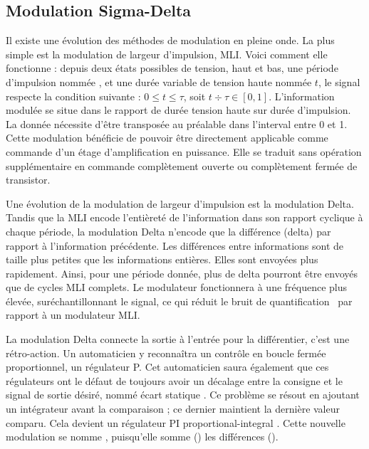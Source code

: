 \documentclass[10pt, oneside, a4paper]{article}
\newcommand{\important}[1]{\textbf{\textsf{\color{gray}{#1}}}}
\begin{document}
\subsection{Modulation Sigma-Delta}
	\label{sec:sigmaDelta}
Il existe une évolution des méthodes de modulation en pleine onde.
La plus simple est la modulation de largeur d'impulsion, MLI.
Voici comment elle fonctionne : depuis deux états possibles de tension, haut et bas, une période d'impulsion nommée \tau, et une durée variable de tension haute nommée $t$, le signal respecte la condition suivante : $0 \leq t \leq \tau $, soit $t \div \tau \in [0,1]$.
L'information modulée se situe dans le rapport de durée tension haute sur durée d'impulsion.
La donnée nécessite d'être transposée au préalable dans l'interval entre 0 et 1.
Cette modulation bénéficie de pouvoir être directement applicable comme commande d'un étage d'amplification en puissance.
Elle se traduit sans opération supplémentaire en commande complètement ouverte ou complètement fermée de transistor.

Une évolution de la modulation de largeur d'impulsion est la modulation Delta.
Tandis que la MLI encode l'entièreté de l'information dans son rapport cyclique à chaque période, la modulation Delta n'encode que la différence (delta) par rapport à l'information précédente.
Les différences entre informations sont de taille plus petites que les informations entières.
Elles sont envoyées plus rapidement.
Ainsi, pour une période donnée, plus de delta pourront être envoyés que de cycles MLI complets.
Le modulateur fonctionnera à une fréquence plus élevée, suréchantillonnant le signal, ce qui réduit le bruit de quantification~\cite{gray1998quantization} par rapport à un modulateur MLI.

La modulation Delta connecte la sortie à l'entrée pour la différentier, c'est une rétro-action.
Un automaticien y reconnaîtra un contrôle en boucle fermée proportionnel, un régulateur P.
Cet automaticien saura également que ces régulateurs ont le défaut de toujours avoir un décalage entre la consigne et le signal de sortie désiré, nommé \og écart statique \fg{}.
Ce problème se résout en ajoutant un intégrateur avant la comparaison ; ce dernier maintient la dernière valeur comparu.
Cela devient un régulateur PI \og proportional-integral \fg{}.
Cette nouvelle modulation se nomme \important{Sigma-Delta}, puisqu'elle somme (\Sigma) les différences (\Delta).
\end{document}
